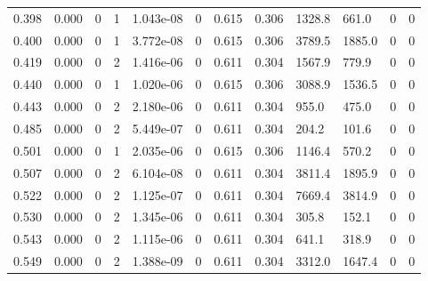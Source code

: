 \documentclass[preview]{standalone}
\begin{document}
{{\begin{tabular}{L{1.2cm}C{1.2cm} C{0.3cm}C{0.5cm} C{1.4cm}C{1.4cm} C{1.4cm}C{1.4cm} C{1.6cm}C{1.6cm} C{1.6cm}C{1.6cm}}
  0.398  &  0.000  & 0     &  1 &  1.043e-08  & 0  &  0.615&   0.306& 1328.8 & 661.0   &  0 & 0  \\ 
  0.400  &  0.000  & 0     &  1 &  3.772e-08  & 0  &  0.615&   0.306& 3789.5 & 1885.0   &  0 & 0  \\ 
  0.419  &  0.000  & 0     &  2 &  1.416e-06  & 0  &  0.611&   0.304& 1567.9 & 779.9   &  0 & 0  \\ 
  0.440  &  0.000  & 0     &  1 &  1.020e-06  & 0  &  0.615&   0.306& 3088.9 & 1536.5   &  0 & 0  \\ 
  0.443  &  0.000  & 0     &  2 &  2.180e-06  & 0  &  0.611&   0.304& 955.0 & 475.0   &  0 & 0  \\ 
  0.485  &  0.000  & 0     &  2 &  5.449e-07  & 0  &  0.611&   0.304& 204.2 & 101.6   &  0 & 0  \\ 
  0.501  &  0.000  & 0     &  1 &  2.035e-06  & 0  &  0.615&   0.306& 1146.4 & 570.2   &  0 & 0  \\ 
  0.507  &  0.000  & 0     &  2 &  6.104e-08  & 0  &  0.611&   0.304& 3811.4 & 1895.9   &  0 & 0  \\ 
  0.522  &  0.000  & 0     &  2 &  1.125e-07  & 0  &  0.611&   0.304& 7669.4 & 3814.9   &  0 & 0  \\ 
  0.530  &  0.000  & 0     &  2 &  1.345e-06  & 0  &  0.611&   0.304& 305.8 & 152.1   &  0 & 0  \\ 
  0.543  &  0.000  & 0     &  2 &  1.115e-06  & 0  &  0.611&   0.304& 641.1 & 318.9   &  0 & 0  \\ 
  0.549  &  0.000  & 0     &  2 &  1.388e-09  & 0  &  0.611&   0.304& 3312.0 & 1647.4   &  0 & 0  \\ 
\hline 
\end{tabular} 

}}
\end{document}
